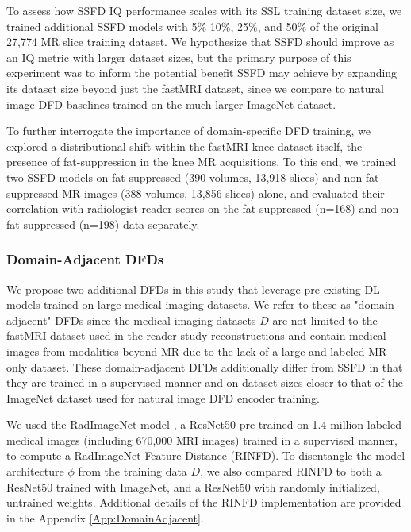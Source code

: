 \documentclass[AMA,STIX2COL,Linenumberson]{MRM}
\begin{document}
To assess how SSFD IQ performance scales with its SSL training dataset size, we trained additional SSFD models with 5\% 10\%, 25\%, and 50\% of the original 27,774 MR slice training dataset. We hypothesize that SSFD should improve as an IQ metric with larger dataset sizes, but the primary purpose of this experiment was to inform the potential benefit SSFD may achieve by expanding its dataset size beyond just the fastMRI dataset, since we compare to natural image DFD baselines trained on the much larger ImageNet dataset.

To further interrogate the importance of domain-specific DFD training, we explored a distributional shift within the fastMRI knee dataset itself, the presence of fat-suppression in the knee MR acquisitions. To this end, we trained two SSFD models on fat-suppressed (390 volumes, 13,918 slices) and non-fat-suppressed MR images (388 volumes, 13,856 slices) alone, and evaluated their correlation with radiologist reader scores on the fat-suppressed (n=168) and non-fat-suppressed (n=198) data separately. 



\subsubsection{Domain-Adjacent DFDs}

We propose two additional DFDs in this study that leverage pre-existing DL models trained on large medical imaging datasets. We refer to these as "domain-adjacent" DFDs since the medical imaging datasets $D$ are not limited to the fastMRI dataset used in the reader study reconstructions and contain medical images from modalities beyond MR due to the lack of a large and labeled MR-only dataset. These domain-adjacent DFDs additionally differ from SSFD in that they are trained in a supervised manner and on dataset sizes closer to that of the ImageNet dataset used for natural image DFD encoder training.

We used the RadImageNet model \cite{mei2022radimagenet}, a ResNet50 pre-trained on 1.4 million labeled medical images (including 670,000 MRI images) trained in a supervised manner, to compute a RadImageNet Feature Distance (RINFD). To disentangle the model architecture $\phi$ from the training data $D$, we also compared RINFD to both a ResNet50 trained with ImageNet, and a ResNet50 with randomly initialized, untrained weights. Additional details of the RINFD implementation are provided in the Appendix \ref{App:DomainAdjacent}.
\end{document}
